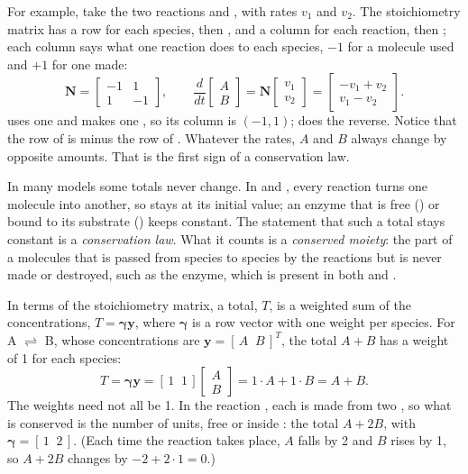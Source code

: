 \documentclass[11pt,a4paper,openany]{report}
\begin{document}
{{For example, take the two reactions  and
, with rates $v_1$ and $v_2$. The stoichiometry matrix has a
row for each species,  then , and a column for each
reaction,  then ; each column says what one reaction does
to each species, $-1$ for a molecule used and $+1$ for one made:
\[
  \mathbf{N} = \begin{bmatrix} -1 & 1 \\ 1 & -1 \end{bmatrix} ,
  \qquad
  \frac{d}{dt} \begin{bmatrix} A \\ B \end{bmatrix}
  = \mathbf{N} \begin{bmatrix} v_1 \\ v_2 \end{bmatrix}
  = \begin{bmatrix} -v_1 + v_2 \\ v_1 - v_2 \end{bmatrix} .
\]
 uses one  and makes one , so its column is
$(-1, 1)$;  does the reverse. Notice that the row of  is
minus the row of . Whatever the rates, $A$ and $B$ always change by
opposite amounts. That is the first sign of a conservation law.

In many models some totals never change. In  and
, every reaction turns one molecule into another, so
 stays at its initial value; an enzyme that is free ()
or bound to its substrate () keeps  constant. The
statement that such a total stays constant is a \emph{conservation law}.
What it counts is a \emph{conserved moiety}: the part of a molecules that
is passed from species to species by the reactions but is never made or
destroyed, such as the enzyme, which is present in both  and
.

In terms of the stoichiometry matrix, a total, $T$, is a weighted sum of the
concentrations, $T = \boldsymbol{\gamma} \mathbf{y}$, where
$\boldsymbol{\gamma}$ is a row vector with one weight per species. For
A $\rightleftharpoons$ B, whose concentrations are $\mathbf{y} = [\,A \;\;
B\,]^T$, the total $A + B$ has a weight of 1 for each species:
\[
  T = \boldsymbol{\gamma} \mathbf{y}
    = [\,1 \;\; 1\,] \begin{bmatrix} A \\ B \end{bmatrix}
    = 1 \cdot A + 1 \cdot B = A + B .
\]
The weights need not all be 1. In the reaction , each
 is made from two , so what is conserved is the number of
 units, free or inside : the total $A + 2B$, with
$\boldsymbol{\gamma} = [\,1 \;\; 2\,]$. (Each time the reaction takes place,
$A$ falls by 2 and $B$ rises by 1, so $A + 2B$ changes by $-2 + 2 \cdot 1 =
0$.)

}}
\end{document}
